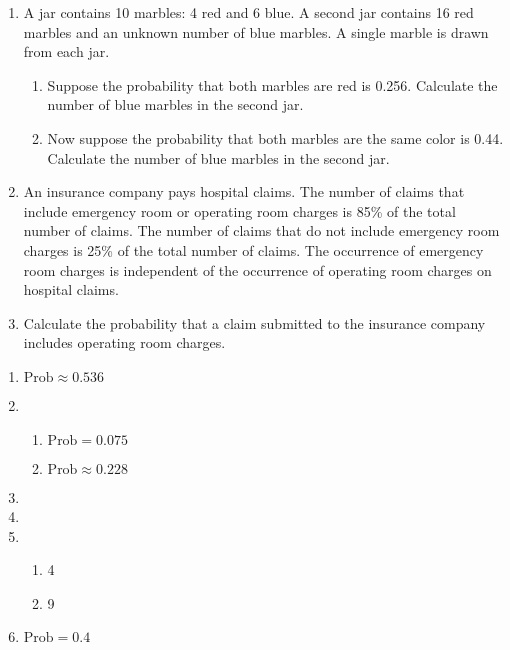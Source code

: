 \documentclass{article}
\begin{document}
\begin{enumerate}
    \item A jar contains 10 marbles: 4 red and 6 blue. A second jar contains 16 red marbles and an unknown number of blue marbles. A single marble is drawn from each jar. %
   \begin{enumerate}
        \item Suppose the probability that both marbles are red is 0.256. Calculate the number of blue marbles in the second jar.%
        \item Now suppose the probability that both marbles are the same color is 0.44. Calculate the number of blue marbles in the second jar.
    \end{enumerate}
    
    \item An insurance company pays hospital claims. The number of claims that include emergency room or operating room charges is 85\% of the total number of claims. The number of claims that do not include emergency room charges is 25\% of the total number of claims. The occurrence of emergency room charges is independent of the occurrence of operating room charges on hospital claims.%
    \item[] Calculate the probability that a claim submitted to the insurance company includes operating room charges.\bigskip
    
\end{enumerate}

\newpage

\begin{enumerate}
    \item $\text{Prob} \approx 0.536$
    
    \item 
    \begin{enumerate}
        \item $\text{Prob} = 0.075$
        \item $\text{Prob} \approx 0.228$
    \end{enumerate}
    
    \item 
    
    \item 
    
    \item 
    \begin{enumerate}
        \item 4
        \item 9
    \end{enumerate}
    
    \item $\text{Prob} = 0.4$
\end{enumerate}
\end{document}
